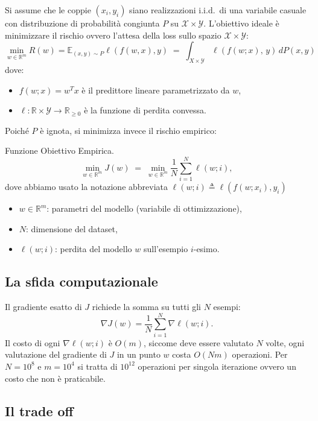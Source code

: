 \documentclass[a4paper,12pt]{article}
\newcommand{\R}{\mathbb{R}}
\begin{document}
Si assume che le coppie $(x_i, y_i)$ siano realizzazioni i.i.d.\ di una variabile casuale con distribuzione di probabilit\`a congiunta $P$ su $\mathcal{X} \times \mathcal{Y}$. L'obiettivo ideale \`e minimizzare il rischio ovvero l'attesa della loss sullo spazio $\mathcal{X}\times\mathcal{Y}$:
\[
  \min_{w \in \R^m}{R}(w)=\mathbb{E}_{(x,y)\sim P}\ell(f(w,x),y) \;=\; \int_{{X} \times \mathcal{Y}} \ell\!\left(f(w;x),\, y\right) \, dP(x,y)
\]
dove:
\begin{itemize}
    \item $f(w;x) = w^T x$ \`e il predittore lineare parametrizzato da $w$,
    \item $\ell: \R \times \mathcal{Y} \to \R_{\geq 0}$ \`e la funzione di perdita convessa.
\end{itemize}

Poich\'e $P$ \`e ignota, si minimizza invece il rischio empirico:

\begin{definitionbox}
  Funzione Obiettivo Empirica.
  \begin{equation}\label{eq:empirical_risk}
    \min_{w \in \R^m} J(w) \;=\; \min_{w \in \R^m}\frac{1}{N} \sum_{i=1}^{N} \ell(w; i),
  \end{equation}
  dove abbiamo usato la notazione abbreviata $\ell(w;i) \triangleq \ell(f(w;x_i), y_i)$
  \begin{itemize}
    \item $w \in \R^m$: parametri del modello (variabile di ottimizzazione),
    \item $N$: dimensione del dataset,
    \item $\ell(w;i)$: perdita del modello $w$ sull'esempio $i$-esimo.
  \end{itemize}
\end{definitionbox}

\subsection{La sfida computazionale}

Il gradiente esatto di $J$ richiede la somma su tutti gli $N$ esempi:
\[
  \nabla J(w) = \frac{1}{N}\sum_{i=1}^N \nabla \ell(w;i).
\]
Il costo di ogni $\nabla \ell(w;i)$ \`e $O(m)$, siccome deve essere valutato $N$ volte, ogni valutazione del gradiente di $J $ in un punto $ w $ costa $O(Nm)$ operazioni. Per $N=10^8$ e $m=10^4$ si tratta di $10^{12}$ operazioni per singola iterazione ovvero un costo che non è praticabile.

\subsection{Il trade off}
\end{document}
